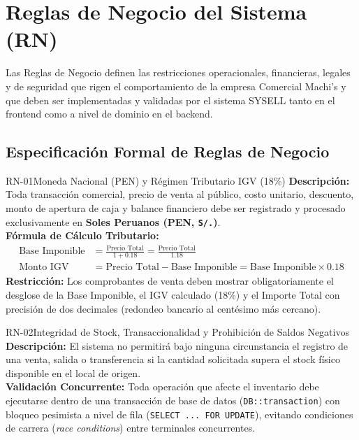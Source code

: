 
\section{Reglas de Negocio del Sistema (RN)}

Las Reglas de Negocio definen las restricciones operacionales, financieras, legales y de seguridad que rigen el comportamiento de la empresa Comercial Machi's y que deben ser implementadas y validadas por el sistema SYSELL tanto en el frontend como a nivel de dominio en el backend.

\subsection{Especificación Formal de Reglas de Negocio}

\begin{rnbox}{RN-01}{Moneda Nacional (PEN) y Régimen Tributario IGV (18\%)}
\textbf{Descripción:} Toda transacción comercial, precio de venta al público, costo unitario, descuento, monto de apertura de caja y balance financiero debe ser registrado y procesado exclusivamente en \textbf{Soles Peruanos (PEN, \texttt{S/.})}.\\
\textbf{Fórmula de Cálculo Tributario:}
\begin{align}
    \text{Base Imponible} &= \frac{\text{Precio Total}}{1 + 0.18} = \frac{\text{Precio Total}}{1.18} \\
    \text{Monto IGV} &= \text{Precio Total} - \text{Base Imponible} = \text{Base Imponible} \times 0.18
\end{align}
\textbf{Restricción:} Los comprobantes de venta deben mostrar obligatoriamente el desglose de la Base Imponible, el IGV calculado (18\%) y el Importe Total con precisión de dos decimales (redondeo bancario al centésimo más cercano).
\end{rnbox}

\begin{rnbox}{RN-02}{Integridad de Stock, Transaccionalidad y Prohibición de Saldos Negativos}
\textbf{Descripción:} El sistema no permitirá bajo ninguna circunstancia el registro de una venta, salida o transferencia si la cantidad solicitada supera el stock físico disponible en el local de origen.\\
\textbf{Validación Concurrente:} Toda operación que afecte el inventario debe ejecutarse dentro de una transacción de base de datos (\texttt{DB::transaction}) con bloqueo pesimista a nivel de fila (\texttt{SELECT ... FOR UPDATE}), evitando condiciones de carrera (\textit{race conditions}) entre terminales concurrentes.
\end{rnbox}

